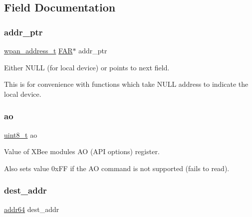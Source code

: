 \subsection{Field Documentation}
\mbox{\label{structsxa__node__t_ae22454fb2324ac2f3c9ddc07fe24ae35}} 
\subsubsection{\texorpdfstring{addr\+\_\+ptr}{addr\_ptr}}
{\footnotesize\ttfamily \hyperlink{structwpan__address__t}{wpan\+\_\+address\+\_\+t} \hyperlink{group__hal_gaef060b3456fdcc093a7210a762d5f2ed}{F\+AR}$\ast$ addr\+\_\+ptr}



Either N\+U\+LL (for local device) or points to next field. 

This is for convenience with functions which take N\+U\+LL address to indicate the local device. \mbox{\label{structsxa__node__t_a4f850621475e7b60aa5aee84dda81a8f}} 
\subsubsection{\texorpdfstring{ao}{ao}}
{\footnotesize\ttfamily \hyperlink{group__hal__dos_gae1affc9ca37cfb624959c866a73f83c2}{uint8\+\_\+t} ao}



Value of X\+Bee module\textquotesingle{}s AO (A\+PI options) register. 

Also sets value 0x\+FF if the AO command is not supported (fails to read). \mbox{\label{structsxa__node__t_abb357ccdd72453fd6f4ee76e18fde30c}} 
\subsubsection{\texorpdfstring{dest\+\_\+addr}{dest\_addr}}
{\footnotesize\ttfamily \hyperlink{unionaddr64}{addr64} dest\+\_\+addr}



